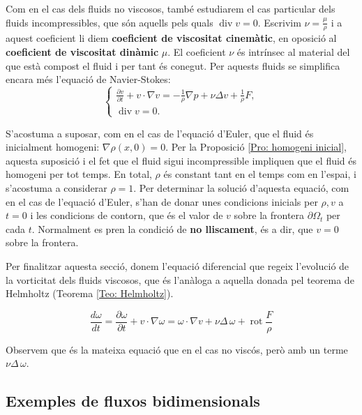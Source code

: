 \documentclass{article}
\numberwithin{equation}{section}
\DeclareMathOperator{\diver}{div}
\DeclareMathOperator{\rot}{rot}
\begin{document}
Com en el cas dels fluids no viscosos, tamb\'{e} estudiarem el cas particular dels fluids incompressibles, que s\'{o}n aquells pels quals $\diver v=0$. Escrivim $\nu=\frac{\mu}{\rho}$ i a aquest coeficient li diem \textbf{coeficient de viscositat cinem\`{a}tic}, en oposici\'{o} al \textbf{coeficient de viscositat din\`{a}mic} $\mu$. El coeficient $\nu$ \'{e}s intr\'{i}nsec al material del que est\`{a} compost el fluid i per tant \'{e}s conegut. Per aquests fluids se simplifica encara m\'{e}s l'equaci\'{o} de Navier-Stokes:
\begin{equation}\label{Equ. Navier-Stokes}
\left\{\begin{array}{l}\displaystyle{\frac{\partial v}{\partial t}+v\cdot\nabla v=-\frac{1}{\rho}\nabla p+\nu\Delta v+\frac{1}{\rho}F,}\\\diver v=0.\end{array}\right.
\end{equation}

S'acostuma a suposar, com en el cas de l'equaci\'{o} d'Euler, que el fluid \'{e}s inicialment homogeni: $\nabla\rho(x,0)=0$. Per la Proposici\'{o} \ref{Pro: homogeni inicial}, aquesta suposici\'{o} i el fet que el fluid sigui incompressible impliquen que el fluid \'{e}s homogeni per tot temps. En total, $\rho$ \'{e}s constant tant en el temps com en l'espai, i s'acostuma a considerar $\rho=1$. Per determinar la soluci\'{o} d'aquesta equaci\'{o}, com en el cas de l'equaci\'{o} d'Euler, s'han de donar unes condicions inicials per $\rho,v$ a $t=0$ i les condicions de contorn, que \'{e}s el valor de $v$ sobre la frontera $\partial\Omega_t$ per cada $t$. Normalment es pren la condici\'{o} de \textbf{no lliscament}, \'{e}s a dir, que $v=0$ sobre la frontera.
\vspace{3mm}

Per finalitzar aquesta secci\'{o}, donem l'equaci\'{o} diferencial que regeix l'evoluci\'{o} de la vorticitat dels fluids viscosos, que \'{e}s l'an\`{a}loga a aquella donada pel teorema de Helmholtz (Teorema \ref{Teo: Helmholtz}).

\begin{equation}\label{Equ. Helmholtz viscos}
\frac{d\omega}{dt}=\frac{\partial\omega}{\partial t}+v\cdot\nabla\omega=\omega\cdot\nabla v+\nu\Delta\,\omega+\rot\frac{F}{\rho}
\end{equation}

Observem que \'{e}s la mateixa equaci\'{o} que en el cas no visc\'{o}s, per\`{o} amb un terme $\nu\Delta\,\omega$.

\subsection{Exemples de fluxos bidimensionals}
\end{document}
